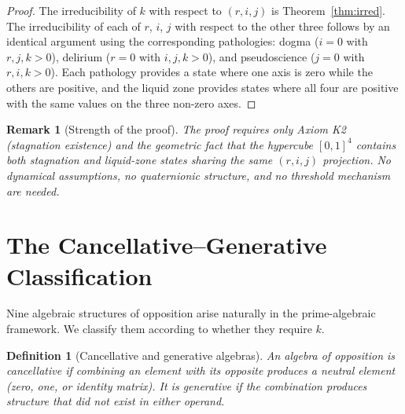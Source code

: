 \documentclass[11pt,a4paper]{article}
\newtheorem{definition}[theorem]{Definition}
\newtheorem{remark}[theorem]{Remark}
\newcommand{\rey}[1]{{\color{rcolor}#1}}
\newcommand{\imag}[1]{{\color{icolor}#1}}
\newcommand{\exac}[1]{{\color{jcolor}#1}}
\newcommand{\recu}[1]{{\color{kcolor}#1}}
\def\rey#1{#1}%
\def\imag#1{#1}%
\def\exac#1{#1}%
\def\recu#1{#1}%
\begin{document}
\begin{proof}
The irreducibility of $\recu{k}$ with respect to $(\rey{r}, \imag{i},
\exac{j})$ is Theorem~\ref{thm:irred}. The irreducibility of each of
$\rey{r}$, $\imag{i}$, $\exac{j}$ with respect to the other three
follows by an identical argument using the corresponding pathologies:
dogma ($\imag{i} = 0$ with $r, j, k > 0$), delirium ($\rey{r} = 0$
with $i, j, k > 0$), and pseudoscience ($\exac{j} = 0$ with $r, i, k
> 0$). Each pathology provides a state where one axis is zero while
the others are positive, and the liquid zone provides states where all
four are positive with the same values on the three non-zero axes.
\end{proof}

\begin{remark}[Strength of the proof]
The proof requires only Axiom K2 (stagnation existence) and the
geometric fact that the hypercube $[0,1]^4$ contains both stagnation
and liquid-zone states sharing the same $(r,i,j)$ projection. No
dynamical assumptions, no quaternionic structure, and no threshold
mechanism are needed.
\end{remark}

\section{The Cancellative--Generative Classification}
\label{sec:split}

Nine algebraic structures of opposition arise naturally in the
prime-algebraic framework. We classify them according to whether they
require $\recu{k}$.

\begin{definition}[Cancellative and generative algebras]
An algebra of opposition is \emph{cancellative} if combining an
element with its opposite produces a neutral element (zero, one, or
identity matrix). It is \emph{generative} if the combination produces
structure that did not exist in either operand.
\end{definition}
\end{document}
